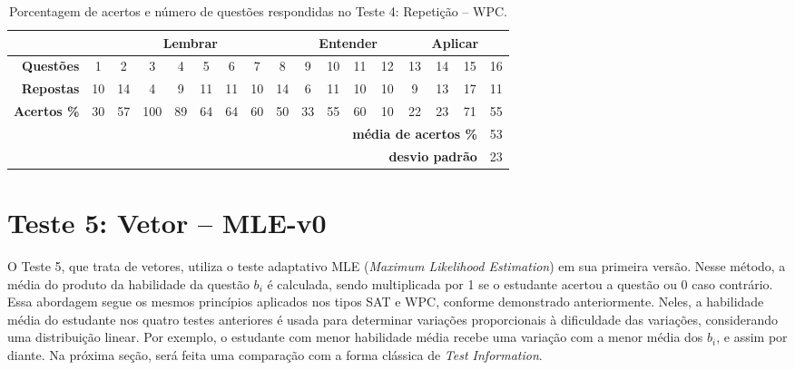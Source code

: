 \begin{table}[!ht]
    \centering
    \caption{Porcentagem de acertos e número de questões respondidas no Teste 4: Repetição -- WPC.}
    \label{tab:respostas_atualizada_teste4}
    \begin{tabular}{|r|*{16}{c|}}
        \hline
        \multicolumn{1}{|l|}{} & \multicolumn{8}{c|}{\cellcolor{green!25}\textbf{Lembrar}} & \multicolumn{4}{c|}{\cellcolor{yellow!25}\textbf{Entender}} & \multicolumn{4}{c|}{\cellcolor{red!25}\textbf{Aplicar}} \\\hline
        \rowcolor[HTML]{D9D9D9} 
        \textbf{Questões}    & 1  & 2 & 3 & 4 & 5 & 6 & 7 & 8 & 9 & 10 & 11 & 12 & 13 & 14 & 15 & 16 \\
        \textbf{Repostas}   & 10 & 14 & 4 & 9 & 11 & 11 & 10 & 14 & 6 & 11 & 10 & 10 & 9 & 13 & 17 & 11 \\
        \rowcolor[HTML]{D9D9D9} 
        \textbf{Acertos \%} & 30 & 57 & 100 & 89 & 64 & 64 & 60 & 50 & 33 & 55 & 60 & 10 & 22 & 23 & 71 & 55 \\ \hline
        \multicolumn{11}{r}{} & \multicolumn{5}{r}{\cellcolor[HTML]{F9CB9C}\textbf{média de acertos \%}} & \multicolumn{1}{c}{\cellcolor[HTML]{F9CB9C}53} \\ 
        \multicolumn{11}{r}{} & \multicolumn{5}{r}{\cellcolor[HTML]{F9CB9C}\textbf{desvio padrão}} & \multicolumn{1}{c}{\cellcolor[HTML]{F9CB9C}23} \\ 
    \end{tabular}
\end{table}

\section{Teste 5: Vetor -- MLE-v0}

O Teste 5, que trata de vetores, utiliza o teste adaptativo MLE (\textit{Maximum Likelihood Estimation}) em sua primeira versão. Nesse método, a média do produto da habilidade da questão \( b_i \) é calculada, sendo multiplicada por 1 se o estudante acertou a questão ou 0 caso contrário. Essa abordagem segue os mesmos princípios aplicados nos tipos SAT e WPC, conforme demonstrado anteriormente. Neles, a habilidade média do estudante nos quatro testes anteriores é usada para determinar variações proporcionais à dificuldade das variações, considerando uma distribuição linear. Por exemplo, o estudante com menor habilidade média recebe uma variação com a menor média dos \( b_i \), e assim por diante. Na próxima seção, será feita uma comparação com a forma clássica de \textit{Test Information}.


